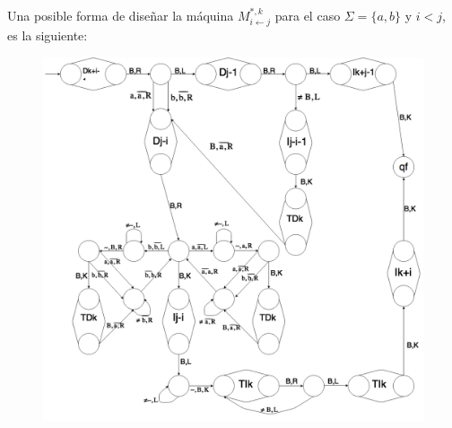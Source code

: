\begin{frame}
  \PN Una posible forma de diseñar la máquina $M_{i \leftarrow j}^{\ast,k}$ para el caso $\Sigma = \{a, b\}$ y $i<j$,
  es la siguiente:
  \begin{figure}[h]
    \centering
    \includegraphics[scale=0.188]{graphics/figure_7.png}
  \end{figure}
\end{frame}
